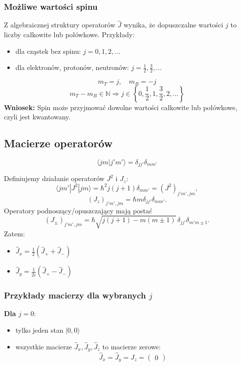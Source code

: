 \subsubsection*{Możliwe wartości spinu}
Z algebraicznej struktury operatorów $\hat{J}$ wynika, że dopuszczalne wartości $j$ to liczby całkowite lub połówkowe. Przykłady:
\begin{itemize}
\item dla cząstek bez spinu: $j = 0, 1, 2, \dots$
\item dla elektronów, protonów, neutronów: $j = \tfrac{1}{2}, \tfrac{3}{2}, \dots$
\end{itemize}
$$
m_T = j, \quad m_B = -j
$$
$$
m_T - m_B \in \mathbb{N} \Rightarrow j \in \left\{0, \frac{1}{2}, 1, \frac{3}{2}, 2, \dots \right\}
$$
\textbf{Wniosek:} Spin może przyjmować dowolne wartości całkowite lub połówkowe, czyli jest kwantowany.

\subsection{Macierze operatorów}
$$
\langle j m | j' m' \rangle = \delta_{jj'} \delta_{mm'}
$$

Definiujemy działanie operatorów $J^2$ i $J_z$:
$$
\langle j m' | J^2 | j m \rangle = \hbar^2 j(j+1) \delta_{mm'} = (J^2)_{j'm', jm},
$$
$$
(J_z)_{j'm', jm} = \hbar m \delta_{jj'} \delta_{mm'}.
$$
Operatory podnoszący/opuszczający mają postać
$$
(J_\pm)_{j'm', jm} = \hbar \sqrt{j(j+1) - m(m \pm 1)} \, \delta_{jj'} \delta_{m'm\pm 1}.
$$
Zatem:
\begin{itemize}
\item $\hat{J}_x = \frac{1}{2}(\hat{J}_+ + \hat{J}_-)$
\item $\hat{J}_y = \frac{1}{2i}(\hat{J}_+ - \hat{J}_-)$
\end{itemize}

\subsubsection*{Przykłady macierzy dla wybranych $j$}
\textbf{Dla $j = 0$}:
\begin{itemize}
\item tylko jeden stan $|0, 0\rangle$
\item wszystkie macierze $\hat{J}_x, \hat{J}_y, \hat{J}_z$ to macierze zerowe:
  $$
  \hat{J}_x = \hat{J}_y = \hat{J}_z = \begin{pmatrix} 0 \end{pmatrix}
  $$
\end{itemize}

